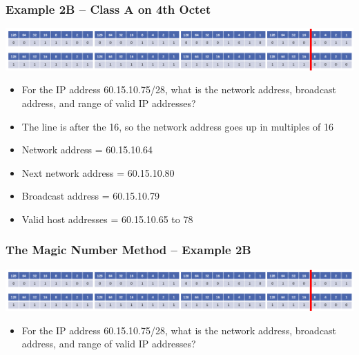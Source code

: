 \documentclass[pdflatex,compress]{beamer}
\begin{document}
\begin{frame}
	\frametitle{Example 2B – Class A on 4th Octet}
	\begin{center}
		\includegraphics[width=\linewidth]{img/img21}
	\end{center}
	\begin{itemize}
		\item<1-> For the IP address 60.15.10.75/28, what is the network address, broadcast address, and range of valid IP addresses?
		\item<2-> The line is after the 16, so the network address goes up in multiples of 16
		\item<2-> Network address = 60.15.10.64
		\item<2-> Next network address = 60.15.10.80
		\item<2-> Broadcast address = 60.15.10.79
		\item<2-> Valid host addresses = 60.15.10.65 to 78
	\end{itemize}
\end{frame}

\begin{frame}
	\frametitle{The Magic Number Method – Example 2B}
	\begin{center}
		\includegraphics[width=\linewidth]{img/img21}
	\end{center}
	\begin{itemize}
		\item For the IP address 60.15.10.75/28, what is the network address, broadcast address, and range of valid IP addresses?
	\end{itemize}
\end{frame}
\end{document}
